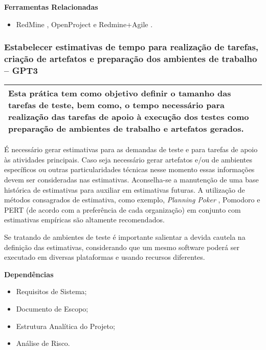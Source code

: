 \textbf{Ferramentas Relacionadas}
\begin{itemize}
    \item RedMine \cite{Redmine}, OpenProject \cite{OpenProject} e Redmine+Agile \cite{RedmineUP}.
\end{itemize}

\subsubsection{Estabelecer estimativas de tempo para realização de tarefas, criação de artefatos e preparação dos ambientes de trabalho – GPT3}
\label{sec:gpt3}

\begin{table}[!ht]
\centering
\begin{tabular}{|p{130mm}|}
\hline
Esta prática tem como objetivo definir o tamanho das tarefas de teste, bem como, o tempo necessário para realização das tarefas de apoio à execução dos testes como preparação de ambientes de trabalho e artefatos gerados. \\ 
\hline
\end{tabular}
\end{table}

É necessário gerar estimativas para as demandas de teste e para tarefas de apoio às atividades principais. Caso seja necessário gerar artefatos e/ou de ambientes específicos ou outras particularidades técnicas nesse momento essas informações devem ser consideradas nas estimativas. Aconselha-se a manutenção de uma base histórica de estimativas para auxiliar em estimativas futuras. A utilização de métodos consagrados de estimativa, como exemplo, \textit{Planning Poker} \cite{Cohn2005}, Pomodoro \cite{Pomodoro2014} e PERT \cite{Pert1998} (de acordo com a preferência de cada organização) em conjunto com estimativas empíricas são altamente recomendados.

Se tratando de ambientes de teste é importante salientar a devida cautela na definição das estimativas, considerando que um mesmo software poderá ser executado em diversas plataformas e usando recursos diferentes. 

\textbf{Dependências}
\begin{itemize}
    \item Requisitos de Sistema;
    \item Documento de Escopo;
    \item Estrutura Analítica do Projeto;
    \item Análise de Risco.
\end{itemize}


